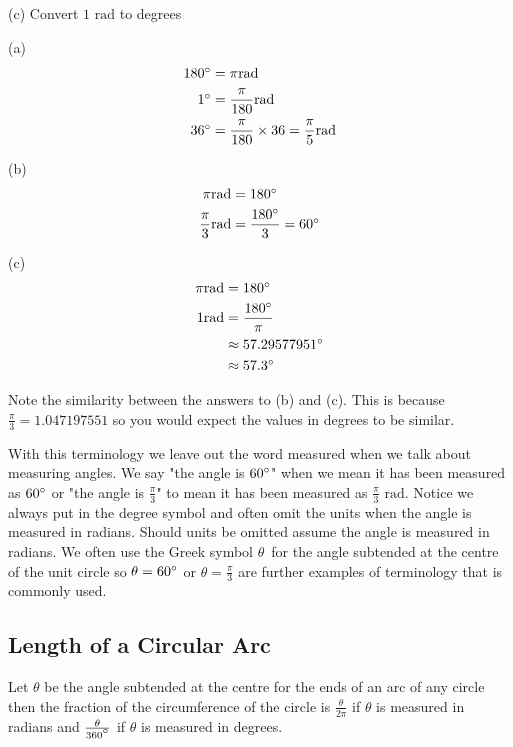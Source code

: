 (c) Convert $1$ $\mbox{rad}$ to degrees 

(a)
\begin{align*}180 \mbox{{\ensuremath{{}^\circ}}} &  =  \pi \text{}\mbox{rad} \\
1 \mbox{{\ensuremath{{}^\circ}}} &  =  \frac{\pi }{180}\text{}\mbox{rad} \\
36 \mbox{{\ensuremath{{}^\circ}}} &  =  \frac{\pi }{180} \times 36 =\frac{\pi }{5}\text{}\mbox{rad}\end{align*}

(b)
\begin{align*}\pi  \mbox{rad} &  =  180 \mbox{{\ensuremath{{}^\circ}}} \\
\frac{\pi }{3} \mbox{rad} &  = \frac{180 \mbox{{\ensuremath{{}^\circ}}}}{3} =60 \mbox{{\ensuremath{{}^\circ}}}\end{align*}

(c)
\begin{align*}\pi  \mbox{rad} &  =  180 \mbox{{\ensuremath{{}^\circ}}} \\
1 \mbox{rad} &  =  \frac{180 \mbox{{\ensuremath{{}^\circ}}}}{\pi } \\
 &  \approx   57.29577951 \mbox{{\ensuremath{{}^\circ}}} \\
 &  \approx   57.3 \mbox{{\ensuremath{{}^\circ}}}\end{align*}

Note the similarity between the answers to (b) and (c). This
is because $\frac{\pi }{3} =1.047197551$ so you would expect the values in degrees to be similar. 



With this terminology we leave out the word measured when we talk about measuring angles. We
say "the angle is $60 \mbox{{\ensuremath{{}^\circ}}}$" when we mean it has been measured as $60 \mbox{{\ensuremath{{}^\circ}}}$ or "the angle is $\frac{\pi }{3}$" to mean it has been measured as $\frac{\pi }{3}$ $\mbox{rad}$. Notice we always put in the degree symbol and
often omit the units when the angle is measured in radians. Should units be omitted assume the angle is measured
in radians. We often use the Greek symbol $\theta $\ for the angle subtended at the centre of the unit circle so $\theta  =60 \mbox{{\ensuremath{{}^\circ}}}$ or $\theta  =\frac{\pi }{3}$ are further examples of terminology that is commonly used.

\subsection{Length of a Circular Arc}
Let $\theta $ be the angle subtended at the centre for the ends of an arc of any circle then the fraction of the circumference of the
circle is $\frac{\theta }{2 \pi }$ if $\theta $ is measured in radians and $\frac{\theta }{360 \mbox{{\ensuremath{{}^\circ}}}}$ if $\theta $ is measured in degrees. 

